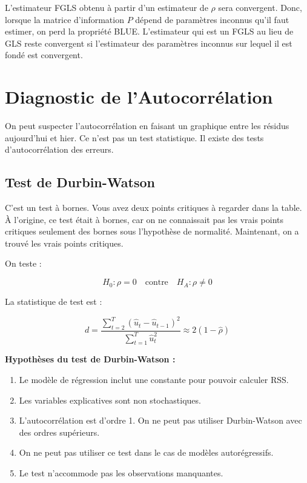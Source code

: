 \documentclass[14pt]{extarticle} %
\theoremstyle{definition}
\theoremstyle{plain}
\begin{document}
L’estimateur FGLS obtenu à partir d’un estimateur de $\rho$ sera convergent. Donc, lorsque la matrice d’information $P$ dépend de paramètres inconnus qu’il faut estimer, on perd la propriété BLUE. L’estimateur qui est un FGLS au lieu de GLS reste convergent si l’estimateur des paramètres inconnus sur lequel il est fondé est convergent.

\section{Diagnostic de l’Autocorrélation}

\textbf{\textcolor{blue}{\cite{gujarati2010}}}

On peut suspecter l’autocorrélation en faisant un graphique entre les résidus aujourd’hui et hier. Ce n’est pas un test statistique. Il existe des tests d’autocorrélation des erreurs.

\subsection{Test de Durbin-Watson}

C’est un test à bornes. Vous avez deux points critiques à regarder dans la table. À l’origine, ce test était à bornes, car on ne connaissait pas les vrais points critiques seulement des bornes sous l’hypothèse de normalité. Maintenant, on a trouvé les vrais points critiques.

On teste :

\[
H_0 : \rho = 0 \quad \text{contre} \quad H_A : \rho \neq 0
\]

La statistique de test est :

\begin{equation}
d = \frac{\sum_{t=2}^{T} ( \hat{u}_t - \hat{u}_{t-1} )^2}{\sum_{t=1}^{T} \hat{u}_t^2} \approx 2(1 - \hat{\rho})
\end{equation}

\textbf{Hypothèses du test de Durbin-Watson :}
\begin{enumerate}
    \item Le modèle de régression inclut une constante pour pouvoir calculer RSS.
    \item Les variables explicatives sont non stochastiques.
    \item L’autocorrélation est d’ordre 1. On ne peut pas utiliser Durbin-Watson avec des ordres supérieurs.
    \item On ne peut pas utiliser ce test dans le cas de modèles autorégressifs.
    \item Le test n’accommode pas les observations manquantes.
\end{enumerate}
\end{document}
